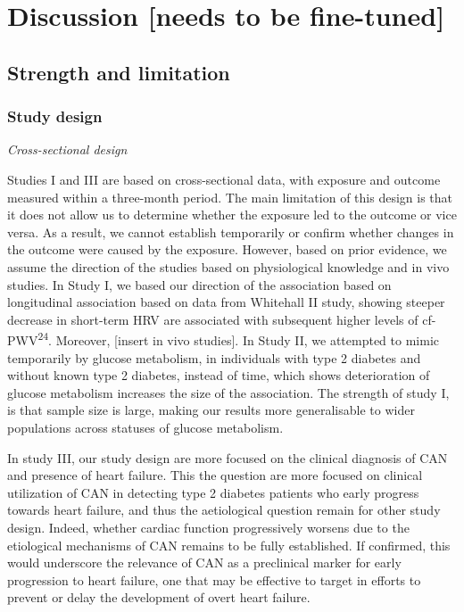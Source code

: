 \documentclass[
  a4paper,
  headsepline=true,
  open=any]{scrbook}
\begin{document}

\hypertarget{discussion-needs-to-be-fine-tuned}{%
\chapter{Discussion {[}needs to be
fine-tuned{]}}\label{discussion-needs-to-be-fine-tuned}}

\hypertarget{strength-and-limitation}{%
\section{Strength and limitation}\label{strength-and-limitation}}

\hypertarget{study-design}{%
\subsection{Study design}\label{study-design}}

\emph{Cross-sectional design}

Studies I and III are based on cross-sectional data, with exposure and
outcome measured within a three-month period. The main limitation of
this design is that it does not allow us to determine whether the
exposure led to the outcome or vice versa. As a result, we cannot
establish temporarily or confirm whether changes in the outcome were
caused by the exposure. However, based on prior evidence, we assume the
direction of the studies based on physiological knowledge and in vivo
studies. In Study I, we based our direction of the association based on
longitudinal association based on data from Whitehall II study, showing
steeper decrease in short-term HRV are associated with subsequent higher
levels of cf-PWV\textsuperscript{24}. Moreover, {[}insert in vivo
studies{]}. In Study II, we attempted to mimic temporarily by glucose
metabolism, in individuals with type 2 diabetes and without known type 2
diabetes, instead of time, which shows deterioration of glucose
metabolism increases the size of the association. The strength of study
I, is that sample size is large, making our results more generalisable
to wider populations across statuses of glucose metabolism.

In study III, our study design are more focused on the clinical
diagnosis of CAN and presence of heart failure. This the question are
more focused on clinical utilization of CAN in detecting type 2 diabetes
patients who early progress towards heart failure, and thus the
aetiological question remain for other study design. Indeed, whether
cardiac function progressively worsens due to the etiological mechanisms
of CAN remains to be fully established. If confirmed, this would
underscore the relevance of CAN as a preclinical marker for early
progression to heart failure, one that may be effective to target in
efforts to prevent or delay the development of overt heart failure.
\end{document}
